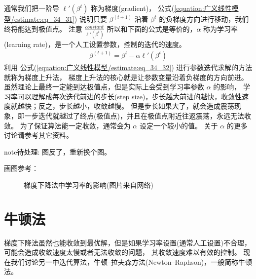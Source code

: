 \documentclass[letterpaper,10pt,english]{sphinxmanual}
\begin{document}
通常我们把一阶导 \(\ell'(\beta^t)\) 称为梯度(gradient)，
公式(\ref{equation:广义线性模型/estimate:eq_34_31}) 说明只要 \(\beta^{(t+1)}\) 沿着 \(\beta^t\) 的负梯度方向进行移动，我们终将能达到极值点。
注意 \(\frac{constant}{\ell'(\beta^t)}\) 
所以和下面的公式是等价的，\(\alpha\) 称为学习率(learning rate)，是一个人工设置参数，控制的迭代的速度。
\begin{equation}\label{equation:广义线性模型/estimate:eq_34_32}
\begin{split}\beta^{(t+1)} = \beta^t - \alpha \ell'(\beta^t)\end{split}
\end{equation}
利用 公式(\ref{equation:广义线性模型/estimate:eq_34_32}) 进行参数迭代求解的方法就称为梯度上升法，
梯度上升法的核心就是让参数变量沿着负梯度的方向前进。
虽然理论上最终一定能到达极值点，但是实际上会受到学习率参数 \(\alpha\) 的影响，
学习率可以理解成每次迭代前进的步长(step size)，步长越大前进的越快，收敛性速度就越快；反之，步长越小，收敛越慢。
但是步长如果大了，就会造成震荡现象，即一步迭代就越过了终点(极值点)，并且在极值点附近往返震荡，永远无法收敛。
为了保证算法能一定收敛，通常会为 \(\alpha\) 设定一个较小的值。
关于 \(\alpha\) 的更多讨论请参考其它资料。

\begin{sphinxadmonition}{note}{\label{\detokenize{_u5e7f_u4e49_u7ebf_u6027_u6a21_u578b/estimate:id5}}待处理:}
图反了，重新换个图。

画图参考：

\end{sphinxadmonition}

\begin{figure}[htbp]
\centering
\capstart

\noindent{}
\caption{梯度下降法中学习率的影响(图片来自网络)}\label{\detokenize{_u5e7f_u4e49_u7ebf_u6027_u6a21_u578b/estimate:id14}}\label{\detokenize{_u5e7f_u4e49_u7ebf_u6027_u6a21_u578b/estimate:fg-34-3}}\end{figure}


\section{牛顿法}
\label{\detokenize{_u5e7f_u4e49_u7ebf_u6027_u6a21_u578b/estimate:id6}}
梯度下降法虽然也能收敛到最优解，但是如果学习率设置(通常人工设置)不合理，可能会造成收敛速度太慢或者无法收敛的问题，
其收敛速度难以有效的控制。
现在我们讨论另一中迭代算法，牛顿–拉夫森方法(Newton–Raphson)，一般简称牛顿法。
\end{document}
